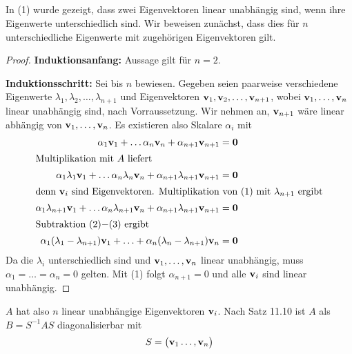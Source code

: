 \documentclass{../mfa}
\begin{document}
\subsection{}

In (1) wurde gezeigt, dass zwei Eigenvektoren linear unabhängig sind, wenn ihre
Eigenwerte unterschiedlich sind. Wir beweisen zunächst, dass dies für $n$
unterschiedliche Eigenwerte mit zugehörigen Eigenvektoren gilt.

\begin{proof}

\textbf{Induktionsanfang:} Aussage gilt für $n=2$.

\textbf{Induktionsschritt:} Sei bis $n$ bewiesen. Gegeben seien paarweise
verschiedene Eigenwerte $\lambda_1, \lambda_2, \ldots, \lambda_{n+1}$ und
Eigenvektoren $\v{1}, \v{2}, \ldots, \v{n+1}$, wobei $\v{1}, \ldots, \v{n}$
linear unabhängig sind, nach Vorraussetzung. Wir nehmen an, $\v{n+1}$ wäre
linear abhängig von $\v{1}, \ldots, \v{n}$. Es existieren also Skalare
$\alpha_i$ mit 
\setcounter{equation}{0}
\begin{align}
   \alpha_1 \v{1} + \ldots \alpha_n \v{n} + \alpha_{n+1} \v{n+1} &= \mbf{0} \\
   \intertext{Multiplikation mit $A$ liefert}
   \alpha_1 \lambda_1 \v{1} + \ldots \alpha_n \lambda_n \v{n} + \alpha_{n+1} \lambda_{n+1} \v{n+1} &= \mbf{0} \\
   \intertext{denn $\v{i}$ sind Eigenvektoren. Multiplikation von (1) mit
   $\lambda_{n+1}$ ergibt}
   \alpha_1 \lambda_{n+1} \v{1} + \ldots \alpha_n \lambda_{n+1} \v{n} + \alpha_{n+1} \lambda_{n+1} \v{n+1} &= \mbf{0} \\
   \intertext{Subtraktion (2)$-$(3) ergibt}
   \alpha_1(\lambda_1 - \lambda_{n+1})\v{1} + \ldots + \alpha_n (\lambda_n -
   \lambda_{n+1})\v{n} &= \mbf{0}
\end{align}
Da die $\lambda_i$ unterschiedlich sind und $\v{1}, \ldots, \v{n}$ linear
unabhängig, muss $\alpha_1 = \ldots = \alpha_n = 0$ gelten. Mit (1) folgt
$\alpha_{n+1} = 0$ und alle $\v{i}$ sind linear unabhängig. 
\end{proof}

$A$ hat also $n$ linear unabhängige
Eigenvektoren $\mathbf{v}_i$. Nach Satz 11.10 ist $A$ als $B=S^{-1} A S$ diagonalisierbar mit
\begin{equation*}
   S = \begin{pmatrix}
      \mathbf{v}_1 \ldots, \mathbf{v}_n
   \end{pmatrix}
\end{equation*}
\end{document}
